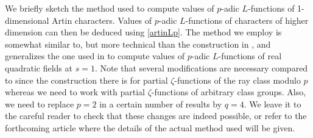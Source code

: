 \documentclass{amsart}
\begin{document}
We briefly sketch the method used to compute values of {$p$-adic{\futurelet{}}}
$L$-functions of 1-dimensional Artin characters.  Values of {$p$-adic{\futurelet{}}}
{$L$-functions{\futurelet{}}} of characters of higher dimension can then be deduced
using \eqref{artinLp}. The method we employ is somewhat similar to, but more technical than
the construction in \cite{Colm88}, and generalizes the one used in \cite{Sol-Rob}
to compute values of $p$-adic $L$-functions of real quadratic fields
at $s = 1$.   
Note that several modifications are necessary compared to \cite{Colm88} since the
construction there is for partial $ {\zeta} $-functions of the ray
class modulo $p$ whereas we need to work with partial $ {\zeta} $-functions of
arbitrary class groups. Also, we need to replace $p = 2$ in a certain
number of results by $q = 4$. We leave it to the careful reader to check
that these changes are indeed possible, or refer to the forthcoming
article \cite{Rob06} where the details of the actual method used will be
given.
\end{document}
